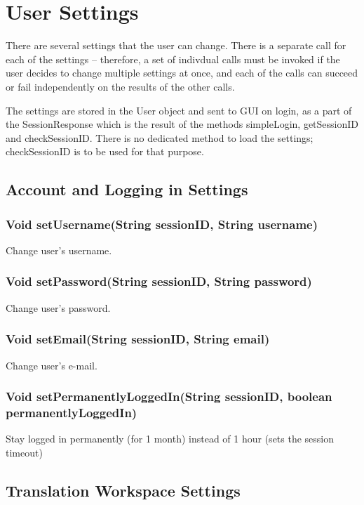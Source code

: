 \section{User Settings}
\label{sec:rpc:settings}

There are several settings that the user can change. There is a separate call for each of the settings -- therefore, a set of indivdual calls must be invoked if the user decides to change multiple settings at once, and each of the calls can succeed or fail independently on the results of the other calls.

The settings are stored in the User object and sent to GUI on login, as a part of the SessionResponse which is the result of the methods simpleLogin, getSessionID and checkSessionID. There is no dedicated method to load the settings; checkSessionID is to be used for that purpose.

\subsection{Account and Logging in Settings}

\subsubsection{Void setUsername(String sessionID, String username)}
Change user's username.

\subsubsection{Void setPassword(String sessionID, String password)}
Change user's password.

\subsubsection{Void setEmail(String sessionID, String email)}
Change user's e-mail.

\subsubsection{Void setPermanentlyLoggedIn(String sessionID, boolean permanentlyLoggedIn)}
Stay logged in permanently (for 1 month) instead of 1 hour (sets the session timeout)

\subsection{Translation Workspace Settings}


